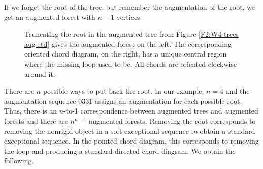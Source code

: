 \documentclass[11pt]{amsart}
\theoremstyle{definition}
\theoremstyle{remark}
\numberwithin{equation}{section}
\begin{document}
If we forget the root of the tree, but remember the augmentation of the root, we get an augmented forest with $n-1$ vertices. 
\begin{figure}[htbp]
\begin{center}
\caption{Truncating the root in the augmented tree from Figure \ref{F2:W4 trees aug rtd} gives the  augmented forest on the left. The corresponding oriented chord diagram, on the right, has a unique central region where the missing loop used to be. All chords are oriented clockwise around it.}
\label{Fig: example of forest and directed chord diagram}
\end{center}
\end{figure}
%

There are $n$ possible ways to put back the root. In our example, $n=4$ and the augmentation sequence $0331$ assigns an augmentation for each possible root. Thus, there is an $n$-to-1 correspondence between augmented trees and augmented forests and there are $n^{n-1}$ augmented forests. Removing the root corresponds to removing the nonrigid object in a soft exceptional sequence to obtain a standard exceptional sequence. In the pointed chord diagram, this corresponds to removing the loop and producing a standard directed chord diagram. We obtain the following.
\end{document}

